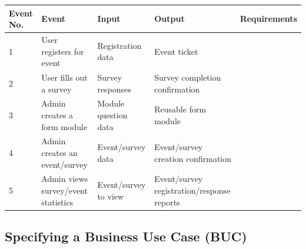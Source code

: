 \documentclass[12pt]{article}
\begin{document}
{\renewcommand{\arraystretch}{1.2}
\begin{table}[H]
\centering
\begin{tabular}{|l|l|l|l|l|}
\hline
Event No. & Event                               & Input                & Output                                                                        & Requirements \\ \hline
1         & User registers for event            & Registration data    & Event ticket                                                                  &              \\ \hline
2         & User fills out a survey             & Survey responses     & Survey completion confirmation                                                &              \\ \hline
3         & Admin creates a form module         & Module question data & Reusable form module                                                          &              \\ \hline
4         & Admin creates an event/survey       & Event/survey data    & Event/survey creation confirmation                                            &              \\ \hline
5         & Admin views survey/event statistics & Event/survey to view & Event/survey registration/response reports                                    &              \\ \hline
\end{tabular}
\label{wfpart}
\end{table}
}

\subsection{Specifying a Business Use Case (BUC)}
\end{document}
